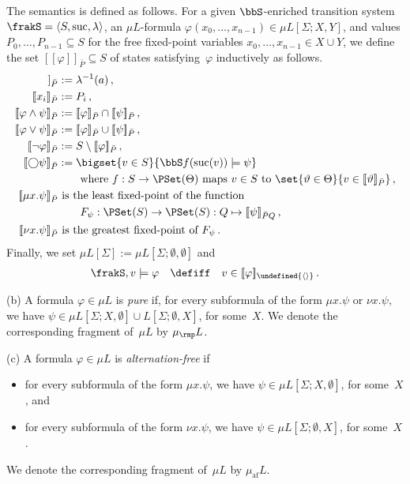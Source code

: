 \documentclass[10pt, fleqn]{scrartcl}
\makeatletter
\newcommand\m@thsm@ller[2]{\mbox{\relscale{0.91}$\m@th#1#2$}}
\let\smaller\undefined
\DeclareRobustCommand\smaller[1]{\relax\ifmmode{\mathpalette\m@thsm@ller{#1}}\else{\relscale{0.91}#1}\fi}
\newcommand*{\suc}{\mathrm{suc}}
\newcommand*{\muaf}{\mu_{\mathrm{af}}}
\newcommand*{\mup}{\mu_\rmp}
\newcommand*{\emptyseq}{\smaller{\langle\rangle}}
\newcommand*{\?}{\kern .08em}
\newcommand\medcircle{\bigcirc}
\newcommand\lsem{[\![}
\newcommand\rsem{]\!]}
\makeatother
\begin{document}
\begin{Def}
The semantics is defined as follows.
For a given $\bbS$-enriched transition system $\frakS = \langle S,\suc,\lambda\rangle$,
an $\mu L$-formula $\varphi(x_0,\dots,x_{n-1}) \in \mu L[\Sigma;X,Y]$, and values
$P_0,\dots,P_{n-1} \subseteq S$ for the free fixed-point variables
$x_0,\dots,x_{n-1} \in X \cup Y$, we define the set $\lsem\varphi\rsem_{\bar P} \subseteq S$
of states satisfying~$\varphi$ inductively as follows.
\begin{align*}
  \lsem a\rsem_{\bar P} &:= \lambda^{-1}(a)\,, \\
  \lsem x_i\rsem_{\bar P} &:= P_i\,, \\
  \lsem\varphi \land \psi\rsem_{\bar P} &:=
    \lsem\varphi\rsem_{\bar P} \cap \lsem\psi\rsem_{\bar P}\,, \\
  \lsem\varphi \lor \psi\rsem_{\bar P} &:=
    \lsem\varphi\rsem_{\bar P} \cup \lsem\psi\rsem_{\bar P}\,, \\
  \lsem\neg\varphi\rsem_{\bar P} &:= S \setminus \lsem\varphi\rsem_{\bar P}\,, \\
  \lsem{\medcircle}\psi\rsem_{\bar P} &:=
    \bigset{ v \in S }{ \bbS f(\suc(v)) \models \psi } \\
    &\qquad\text{where } f : S \to \PSet(\Theta) \text{ maps } v \in S \text{ to }
    \set{ \vartheta \in \Theta }{ v \in \lsem\vartheta\rsem_{\bar P} }\,, \\
  \lsem\mu x.\psi\rsem_{\bar P} &\text{ is the least fixed-point of the function} \\
    &\qquad F_\psi : \PSet(S) \to \PSet(S) : Q \mapsto \lsem\psi\rsem_{\bar PQ}\,, \\
  \lsem\nu x.\psi\rsem_{\bar P} &\text{ is the greatest fixed-point of } F_\psi\,.
\end{align*}
Finally, we set $\mu L[\Sigma] := \mu L[\Sigma;\emptyset,\emptyset]$ and
\begin{align*}
  \frakS,v \models \varphi \quad\defiff\quad v \in \lsem\varphi\rsem_\emptyseq\,.
\end{align*}

(b) A formula $\varphi \in \mu L$ is \emph{pure} if, for every subformula
of the form $\mu x.\psi$ or $\nu x.\psi$, we have
$\psi \in \mu L[\Sigma;X,\emptyset] \cup L[\Sigma;\emptyset,X]$, for some~$X$.
We denote the corresponding fragment of~$\mu L$ by $\mup L$.

(c) A formula $\varphi \in \mu L$ is \emph{alternation-free} if
\begin{itemize}
\item for every subformula of the form $\mu x.\psi$, we have
  $\psi \in \mu L[\Sigma;X,\emptyset]$, for some~$X$, and
\item for every subformula of the form $\nu x.\psi$, we have
  $\psi \in \mu L[\Sigma;\emptyset,X]$, for some~$X$.
\end{itemize}
We denote the corresponding fragment of~$\mu L$ by $\muaf L$.
\end{Def}
\end{document}
